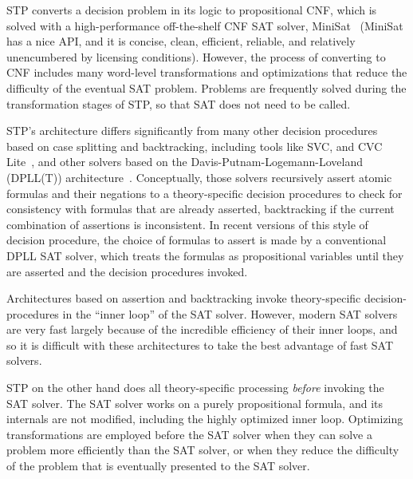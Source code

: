 

STP converts a decision problem in its logic to propositional CNF,
which is solved with a high-performance off-the-shelf CNF SAT solver,
MiniSat~\cite{minisat} (MiniSat has a nice API, and it is concise,
clean, efficient, reliable, and relatively unencumbered by licensing
conditions).  However, the process of converting to CNF includes many
word-level transformations and optimizations that reduce the
difficulty of the eventual SAT problem.  Problems are frequently
solved during the transformation stages of STP, so that SAT does not
need to be called.

STP's architecture differs significantly from many other decision
procedures based on case splitting and backtracking, including tools
like SVC, and CVC Lite~\cite{svc,cvcl}, and other solvers
based on the Davis-Putnam-Logemann-Loveland (DPLL(T))
architecture~\cite{ganzinger04dpllt}.  Conceptually, those solvers
recursively assert atomic formulas and their negations to a
theory-specific decision procedures to check for consistency with
formulas that are already asserted, backtracking if the current
combination of assertions is inconsistent.  In recent versions of this
style of decision procedure, the choice of formulas to assert is made
by a conventional DPLL SAT solver, which treats the formulas as
propositional variables until they are asserted and the decision
procedures invoked.

Architectures based on assertion and backtracking invoke
theory-specific decision-procedures in the ``inner loop'' of the SAT
solver.  However, modern SAT solvers are very fast largely because of
the incredible efficiency of their inner loops, and so it is difficult
with these architectures to take the best advantage of fast SAT
solvers.

STP on the other hand does all theory-specific processing {\em
before\/} invoking the SAT solver.  The SAT solver works on a purely
propositional formula, and its internals are not modified, including
the highly optimized inner loop.  Optimizing transformations are
employed before the SAT solver when they can solve a problem more
efficiently than the SAT solver, or when they reduce the difficulty of
the problem that is eventually presented to the SAT solver.

